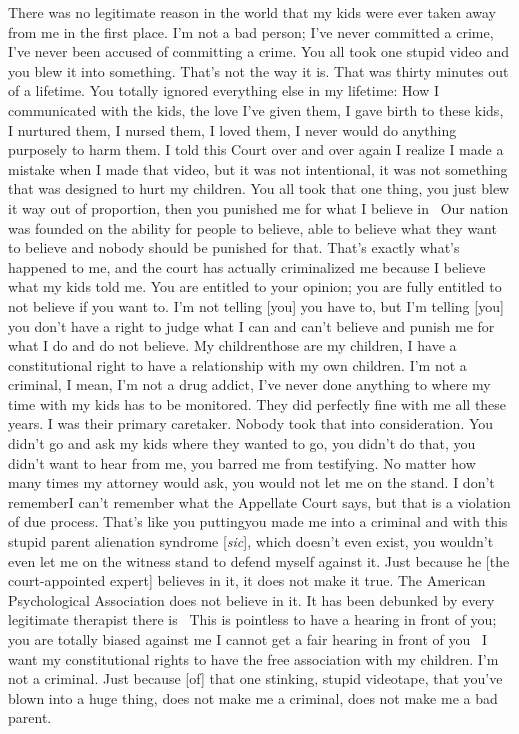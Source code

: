 \documentclass[11pt, twoside]{article}
\begin{document}
{{\begin{blockQuote}
There was no legitimate reason in the world that my kids were ever
taken away from me in the first place. I’m not a bad person; I’ve
never committed a crime, I’ve never been accused of committing a
crime. You all took one stupid video and you blew it
into something. That’s not the way it is. That was thirty minutes out of a
lifetime. You totally ignored everything else in my lifetime: How I
communicated with the kids, the love I’ve given them, I gave birth
to these kids, I nurtured them, I nursed them, I loved them, I never
would do anything purposely to harm them. I told this Court over
and over again I realize I made a mistake when I made that video,
but it was not intentional, it was not something that was designed
to hurt my children. You all took that one thing, you just blew it
way out of proportion, then you punished me for what I believe
in\ellFour{2pt}{2pt}
\parbreak{}
\ellThree{2pt}{2pt}\ Our nation was founded on the ability for people to believe,
able to believe what they want to believe and nobody should be
punished for that. That’s exactly what’s happened to me, and the
court has actually criminalized me because I believe what my kids
told me. You are entitled to your opinion; you are fully entitled to
not believe if you want to. I’m not telling [you] you have to, but
I’m telling [you] you don’t have a right to judge what I can and
can’t believe and punish me for what I do and do not believe. My
children\mdash{}those are my children, I have a constitutional right to
have a relationship with my own children. I’m not a criminal, I
mean, I’m not a drug addict, I’ve never done anything to where
my time with my kids has to be monitored. They did perfectly
fine with me all these years. I was their primary caretaker. Nobody took that into consideration. You didn’t go and ask my kids
where they wanted to go, you didn’t do that, you didn’t want to
hear from me, you barred me from testifying. No matter how many
times my attorney would ask, you would not let me on the stand. I
don’t remember\mdash{}I can’t remember what the Appellate Court says,
but that is a violation of due process. That’s like you putting\mdash{}you
made me into a criminal and with this stupid parent
alienation syndrome [\textit{sic}], which doesn’t even exist, you wouldn’t even let me on
the witness stand to defend myself against it. Just because he [the
court-appointed expert] believes in it, it does not make it true. The
American Psychological Association does not believe in it. It has
been debunked by every legitimate therapist there is\ellFour{2pt}{2pt}
\parbreak{}
\ellThree{2pt}{2pt}\ This is pointless to have a hearing in front of you; you are
totally biased against me\ellFour{2pt}{2pt} I cannot get a fair hearing in front of
you\ellFour{2pt}{2pt}
\parbreak{}
\ellThree{2pt}{2pt}\ I want my constitutional rights to have the free association
with my children. I’m not a criminal. Just because [of] that one
stinking, stupid videotape, that you’ve blown into a huge thing,
does not make me a criminal, does not make me a bad parent.
\end{blockQuote}

}}
\end{document}
